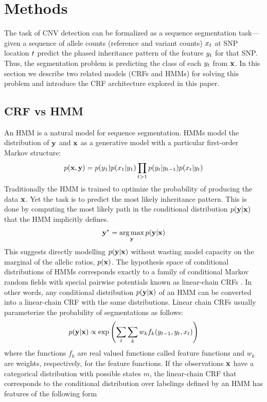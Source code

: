 \section{Methods}
The task of CNV detection can be formalized as a sequence segmentation task---given a sequence of allele counts (reference and variant counts) $x_{t}$ at SNP location $t$ predict the phased inheritance pattern of the feature $y_{t}$ for that SNP. Thus, the segmentation problem is predicting the class of each $y_{t}$ from $\mathbf{x}$. In this section we describe two related models (CRFs and HMMs) for solving this problem and introduce the CRF architecture explored in this paper.

\subsection{CRF vs HMM}
An HMM is a natural model for sequence segmentation. HMMs model the distribution of $\mathbf{y}$ and $\mathbf{x}$ as a generative model with a particular first-order Markov structure:
\begin{align*}
p(\mathbf{x}, \mathbf{y}) = p(y_1) p(x_1 | y_1) \prod_{t > 1} p(y_{t} | y_{t-1})  p(x_{t} | y_{t})
\end{align*}
Traditionally the HMM is trained to optimize the probability of producing the data $\mathbf{x}$. Yet the task is to predict the most likely inheritance pattern. This is done by computing the most likely path in the conditional distribution $p(\mathbf{y} | \mathbf{x})$ that the HMM implicitly defines. 
\begin{align*}
\mathbf{y}^* = \operatorname*{arg\,max}_{\mathbf{y}} p(\mathbf{y} | \mathbf{x})
\end{align*}
This suggests directly modelling $p(\mathbf{y} | \mathbf{x})$ without wasting model capacity on the marginal of the allelic ratios, $p(\mathbf{x})$. The hypothesis space of conditional distributions of HMMs corresponds exactly to a family of conditional Markov random fields with special pairwise potentials known as linear-chain CRFs \citep{sutton2012}. In other words, any conditional distribution $p(\mathbf{y} | \mathbf{x})$ of an HMM can be converted into a linear-chain CRF with the same distributions. Linear chain CRFs usually parameterize the probability of segmentations as follows:
\begin{align*}
p(\mathbf{y} | \mathbf{x}) \propto \exp\left( \sum_{t} \sum_{k} w_k f_k(y_{t-1}, y_{t}, x_{t})\right)
\end{align*}
where the functions $f_k$ are real valued functions called feature functions and $w_k$ are weights, respectively, for the feature functions. If the observations $\mathbf{x}$ have a categorical distribution with possible states $m$, the linear-chain CRF that corresponds to the conditional distribution over labelings defined by an HMM has features of the following form
